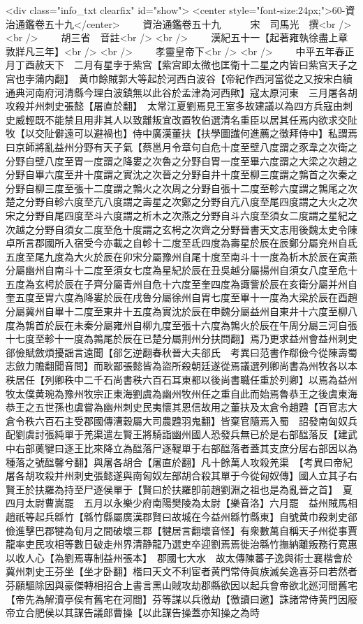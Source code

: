 <div class="info_txt clearfix" id="show">
<center style="font-size:24px;">60-資治通鑑卷五十九</center>
  　　資治通鑑卷五十九　　　宋　司馬光　撰<br />
<br />
　　胡三省　音註<br />
<br />
　　漢紀五十一【起著雍執徐盡上章敦牂凡三年】<br />
<br />
　　孝靈皇帝下<br />
<br />
　　中平五年春正月丁酉赦天下　二月有星孛于紫宫【紫宫即太微也匡衛十二星之内皆曰紫宫天子之宫也孛蒲内翻】　黄巾餘賊郭大等起於河西白波谷【帝紀作西河當從之又按宋白續通典河南府河清縣今理白波鎮無以此谷於孟津為河西歟】寇太原河東　三月屠各胡攻殺并州刺史張懿【屠直於翻】　太常江夏劉焉見王室多故建議以為四方兵寇由刺史威輕既不能禁且用非其人以致離叛宜改置牧伯選清名重臣以居其任焉内欲求交阯牧【以交阯僻遠可以避禍也】侍中廣漢董扶【扶學圖䜟何進薦之徵拜侍中】私謂焉曰京師將亂益州分野有天子氣【蔡邕月令章句自危十度至壁八度謂之豕韋之次衛之分野自壁八度至胃一度謂之降婁之次魯之分野自胃一度至畢六度謂之大梁之次趙之分野自畢六度至井十度謂之實沈之次晉之分野自井十度至柳三度謂之鶉首之次秦之分野自柳三度至張十二度謂之鶉火之次周之分野自張十二度至軫六度謂之鶉尾之次楚之分野自軫六度至亢八度謂之壽星之次鄭之分野自亢八度至尾四度謂之大火之次宋之分野自尾四度至斗六度謂之析木之次燕之分野自斗六度至須女二度謂之星紀之次越之分野自須女二度至危十度謂之玄枵之次齊之分野晉書天文志用後魏太史令陳卓所言郡國所入宿受今亦載之自軫十二度至氐四度為壽星於辰在辰鄭分屬兖州自氐五度至尾九度為大火於辰在卯宋分屬豫州自尾十度至南斗十一度為析木於辰在寅燕分屬幽州自南斗十二度至須女七度為星紀於辰在丑吳越分屬揚州自須女八度至危十五度為玄枵於辰在子齊分屬青州自危十六度至奎四度為諏訾於辰在亥衛分屬并州自奎五度至胃六度為降婁於辰在戌魯分屬徐州自胃七度至畢十一度為大梁於辰在酉趙分屬冀州自畢十二度至東井十五度為實沈於辰在申魏分屬益州自東井十六度至柳八度為鶉首於辰在未秦分屬雍州自柳九度至張十六度為鶉火於辰在午周分屬三河自張十七度至軫十一度為鶉尾於辰在已楚分屬荆州分扶問翻】焉乃更求益州會益州刺史郤儉賦斂煩擾謡言遠聞【郤乞逆翻春秋晉大夫郤氏　考異曰范書作郗儉今從陳壽蜀志斂力贍翻聞音問】而耿鄙張懿皆為盜所殺朝廷遂從焉議選列卿尚書為州牧各以本秩居任【列卿秩中二千石尚書秩六百石耳東都以後尚書職任重於列卿】以焉為益州牧太僕黄琬為豫州牧宗正東海劉虞為幽州牧州任之重自此而始焉魯恭王之後虞東海恭王之五世孫也虞嘗為幽州刺史民夷懷其恩信故用之董扶及太倉令趙韙【百官志大倉令秩六百石主受郡國傳漕穀屬大司農韙羽鬼翻】皆棄官隨焉入蜀　詔發南匈奴兵配劉虞討張純單于羌渠遣左賢王將騎詣幽州國人恐發兵無已於是右部䤈落反【建武中右部薁犍曰逐王比來降立為䤈落尸逐鞮單于右部䤈落者蓋其支庶分居右部因以為種落之號䤈馨兮翻】與屠各胡合【屠直於翻】凡十餘萬人攻殺羌渠　【考異曰帝紀屠各胡攻殺并州刺史張懿遂與南匈奴左部胡合殺其單于今從匈奴傳】國人立其子右賢王於扶羅為持至尸逐侯單于【賢曰於扶羅卽前趙劉淵之祖也是為亂晉之首】　夏四月太尉曹嵩罷　五月以永樂少府南陽樊陵為太尉【樂音洛】六月罷　益州賊馬相趙祇等起兵緜竹【緜竹縣屬廣漢郡賢曰故城在今益州緜竹縣東】自號黄巾殺刺史郤儉進擊巴郡犍為旬月之間破壞三郡【犍居言翻壞音怪】有衆數萬自稱天子州從事賈龍率吏民攻相等數日破走州界清静龍乃選吏卒迎劉焉焉徙治緜竹撫納離叛務行寛惠以收人心【為劉焉專制益州張本】　郡國七大水　故太傳陳蕃子逸與術士襄楷會於冀州刺史王芬坐【坐才卧翻】楷曰天文不利宦者黄門常侍眞族滅矣逸喜芬曰若然者芬願驅除因與豪傑轉相招合上書言黑山賊攻劫郡縣欲因以起兵會帝欲北廵河間舊宅【帝先為解瀆亭侯有舊宅在河間】芬等謀以兵徼劫【徼讀曰邀】誅諸常侍黄門因廢帝立合肥侯以其謀告議郎曹操【以此謀告操蓋亦知操之為時